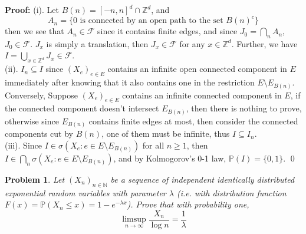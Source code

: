 \documentclass[12pt]{article}
\newtheorem{problem}{Problem}
\begin{document}
\textbf{Proof:} (i). Let $B(n)=[-n,n]^d\cap\mathbb{Z}^d$, and 
$$
    A_n=\{0\text{ is connected by an open path to the set }B(n)^c\}
$$
then we see that $A_n\in\mathcal{F}$ since it contains finite edges, and since $J_0=\bigcap\limits_{n}A_n$, $J_0\in\mathcal{F}$. $J_x$ is simply a translation, then $J_x\in\mathcal{F}$ for any $x\in \mathbb{Z}^d$. Further, we have $I=\bigcup\limits_{x\in\mathbb{Z}^d}J_x\in\mathcal{F}$. \\
\indent (ii). $I_n\subseteq I$ since $(X_e)_{e\in E}$ contains an infinite open connected component in $E$ immediately after knowing that it also contains one in the restriction $E\setminus E_{B(n)}$. Conversely, Suppose $(X_e)_{e\in E}$ contains an infinite connected component in $E$, if the connected component doesn't intersect $E_{B(n)}$, then there is nothing to prove, otherwise since $E_{B(n)}$ contains finite edges at most, then consider the connected components cut by $B(n)$, one of them must be infinite, thus $I\subseteq I_n$. \\
\indent (iii). Since $I\in\sigma(X_e: e\in E\setminus E_{B(n)})$ for all $n\geq 1$, then $I\in\bigcap\limits_{n}\sigma(X_e: e\in E\setminus E_{B(n)})$, and by Kolmogorov's 0-1 law, $\mathbb{P}(I)=\{0,1\}$. \qed
\\
\begin{problem}
    Let $(X_n)_{n\in\mathbb{N}}$ be a sequence of independent identically distributed exponential random variables with parameter $\lambda$ (i.e. with distribution function $F(x)=\mathbb{P}(X_n\leq x)=1-e^{-\lambda x}$). Prove that with probability one, 
    $$
        \limsup_{n\to\infty}\frac{X_n}{\log n}=\frac{1}{\lambda}
    $$
\end{problem}
\end{document}
